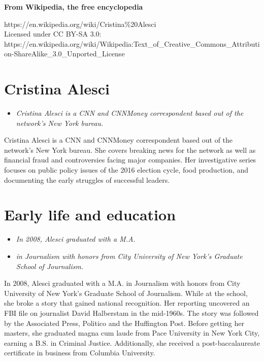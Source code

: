 \textbf{From Wikipedia, the free encyclopedia}

https://en.wikipedia.org/wiki/Cristina\%20Alesci\\
Licensed under CC BY-SA 3.0:\\
https://en.wikipedia.org/wiki/Wikipedia:Text\_of\_Creative\_Commons\_Attribution-ShareAlike\_3.0\_Unported\_License

\section{Cristina Alesci}\label{cristina-alesci}

\begin{itemize}
\item
  \emph{Cristina Alesci is a CNN and CNNMoney correspondent based out of
  the network's New York bureau.}
\end{itemize}

Cristina Alesci is a CNN and CNNMoney correspondent based out of the
network's New York bureau. She covers breaking news for the network as
well as financial fraud and controversies facing major companies. Her
investigative series focuses on public policy issues of the 2016
election cycle, food production, and documenting the early struggles of
successful leaders.

\section{Early life and education}\label{early-life-and-education}

\begin{itemize}
\item
  \emph{In 2008, Alesci graduated with a M.A.}
\item
  \emph{in Journalism with honors from City University of New York's
  Graduate School of Journalism.}
\end{itemize}

In 2008, Alesci graduated with a M.A. in Journalism with honors from
City University of New York's Graduate School of Journalism. While at
the school, she broke a story that gained national recognition. Her
reporting uncovered an FBI file on journalist David Halberstam in the
mid-1960s. The story was followed by the Associated Press, Politico and
the Huffington Post. Before getting her masters, she graduated magna cum
laude from Pace University in New York City, earning a B.S. in Criminal
Justice. Additionally, she received a post-baccalaureate certificate in
business from Columbia University.

